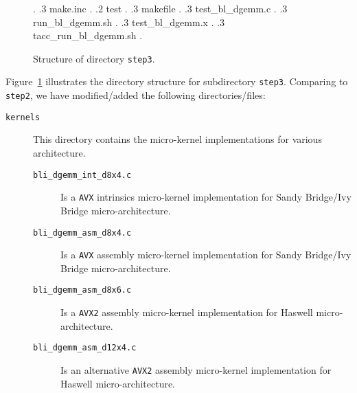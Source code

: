 \begin{figure}[tb!]
\begin{center}
\begin{minipage}{4in}
{%
.
		.3 make.inc 
.
		.2 test 
.
		.3 makefile 
.
		.3 test\_bl\_dgemm.c 
.
		.3 run\_bl\_dgemm.sh 
.
		.3 test\_bl\_dgemm.x 
.       
		.3 tacc\_run\_bl\_dgemm.sh 
.	
	}
\end{minipage}
\end{center}
\caption{Structure of directory {\tt step3}.}
\label{fig:DirStep1}
\end{figure}

Figure~\ref{fig:DirStep1} illustrates the directory
structure for subdirectory {\tt step3}. Comparing to {\tt step2}, we have modified/added the following directories/files:

\begin{description}
\item[{\tt kernels}] This directory contains the micro-kernel implementations for various architecture.
\begin{description}
\item[{\tt bli\_dgemm\_int\_d8x4.c}] Is a {\tt AVX} intrinsics micro-kernel implementation for Sandy Bridge/Ivy Bridge micro-architecture.
\item[{\tt bli\_dgemm\_asm\_d8x4.c}] Is a {\tt AVX} assembly micro-kernel implementation for Sandy Bridge/Ivy Bridge micro-architecture.
\item[{\tt bli\_dgemm\_asm\_d8x6.c}] Is a {\tt AVX2} assembly micro-kernel implementation for Haswell micro-architecture.
\item[{\tt bli\_dgemm\_asm\_d12x4.c}] Is an alternative {\tt AVX2} assembly micro-kernel implementation for Haswell micro-architecture.
\end{description}
\end{description}


